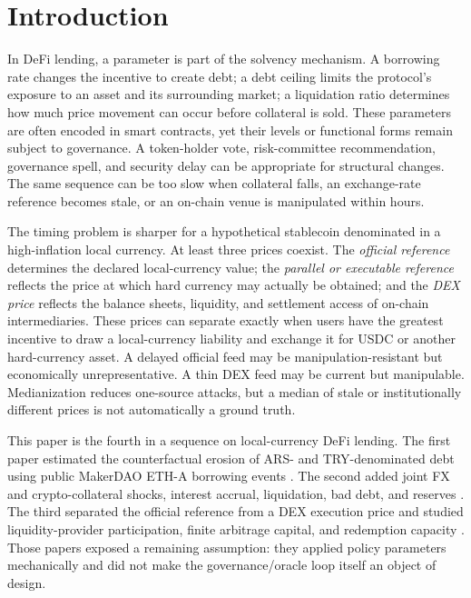 \documentclass[sn-vancouver,Numbered]{sn-jnl}
\begin{document}

\maketitle

\section{Introduction}\label{sec:introduction}

In DeFi lending, a parameter is part of the solvency mechanism. A borrowing rate changes the incentive to create debt; a debt ceiling limits the protocol's exposure to an asset and its surrounding market; a liquidation ratio determines how much price movement can occur before collateral is sold. These parameters are often encoded in smart contracts, yet their levels or functional forms remain subject to governance. A token-holder vote, risk-committee recommendation, governance spell, and security delay can be appropriate for structural changes. The same sequence can be too slow when collateral falls, an exchange-rate reference becomes stale, or an on-chain venue is manipulated within hours.

The timing problem is sharper for a hypothetical stablecoin denominated in a high-inflation local currency. At least three prices coexist. The \emph{official reference} determines the declared local-currency value; the \emph{parallel or executable reference} reflects the price at which hard currency may actually be obtained; and the \emph{DEX price} reflects the balance sheets, liquidity, and settlement access of on-chain intermediaries. These prices can separate exactly when users have the greatest incentive to draw a local-currency liability and exchange it for USDC or another hard-currency asset. A delayed official feed may be manipulation-resistant but economically unrepresentative. A thin DEX feed may be current but manipulable. Medianization reduces one-source attacks, but a median of stale or institutionally different prices is not automatically a ground truth.

This paper is the fourth in a sequence on local-currency DeFi lending. The first paper estimated the counterfactual erosion of ARS- and TRY-denominated debt using public MakerDAO ETH-A borrowing events \cite{RokniLamouki2026Debt}. The second added joint FX and crypto-collateral shocks, interest accrual, liquidation, bad debt, and reserves \cite{RokniLamouki2026Solvency}. The third separated the official reference from a DEX execution price and studied liquidity-provider participation, finite arbitrage capital, and redemption capacity \cite{RokniLamouki2026Peg}. Those papers exposed a remaining assumption: they applied policy parameters mechanically and did not make the governance/oracle loop itself an object of design.
\end{document}
